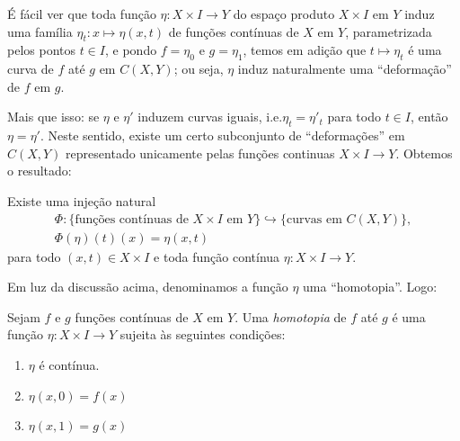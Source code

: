 É fácil ver que toda função $\eta : X \times I \to Y$ do espaço produto $X \times I$ em $Y$ induz uma família $\eta_t : x \mapsto \eta(x, t)$ de funções contínuas de $X$ em $Y$, parametrizada pelos pontos $t \in I$, e pondo $f = \eta_0$ e $g = \eta_1$, temos em adição que $t \mapsto \eta_t$ é uma curva de $f$ até $g$ em $C(X, Y)$; ou seja, $\eta$ induz naturalmente uma ``deformação'' de $f$ em $g$.%
\linebreak\vspace{-1.2em}

Mais que isso: se $\eta$ e $\eta'$ induzem curvas iguais, i.e.\@ $\eta_t = \eta'_t$ para todo $t \in I$, então $\eta = \eta'$. Neste sentido, existe um certo subconjunto de ``deformações'' em $C(X, Y)$ representado unicamente pelas funções continuas $X \times I \to Y$. Obtemos o resultado:

\vspace{0.5em}

\begin{proposition}
    Existe uma injeção natural
    \begin{equation*}
    \begin{gathered}
        \Phi : \{ \text{funções contínuas de $X \times I$ em $Y$} \} \hookrightarrow \{ \text{curvas em $C(X, Y)$} \},
        \\
        \Phi(\eta)(t)(x) = \eta(x, t)
    \end{gathered}
    \end{equation*}
    para todo $(x, t) \in X \times I$ e toda função contínua $\eta : X \times I \to Y$.
    \qedalt
\end{proposition}

Em luz da discussão acima, denominamos a função $\eta$ uma ``homotopia''. Logo:

\vspace{0.5em}

\begin{definition}[(Homotopias)]
    Sejam $f$ e $g$ funções contínuas de $X$ em $Y$. Uma \emph{homotopia} de $f$ até $g$ é uma função $\eta : X \times I \to Y$ sujeita às seguintes condições:%
    \linebreak\vspace{-1.2em}
%
    \begin{enumerate}
    [
        itemsep=0pt,
        label={(\roman*)}
    ]
        \item
        $\eta$ é contínua.

        \item
        $\eta(x, 0) = f(x)$
        
        \item
        $\eta(x, 1) = g(x)$
        \qedalt
    \end{enumerate}
\end{definition}

